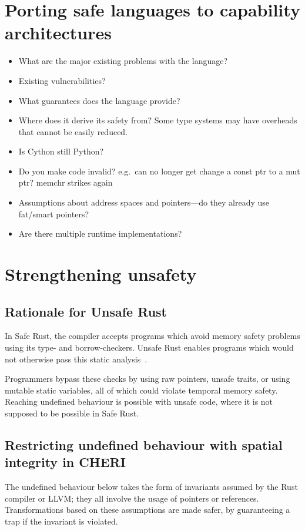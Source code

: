 \documentclass[dissertation.tex]{subfiles}
\begin{document}
\section{Porting safe languages to capability architectures}
\label{sec:eval-othersafe}

\begin{itemize}
    \item What are the major existing problems with the language?
    \item Existing vulnerabilities?
    \item What guarantees does the language provide?
    \item Where does it derive its safety from? Some type systems may
    have overheads that cannot be easily reduced.
    \item Is Cython still Python?
    \item Do you make code invalid? e.g.\ can no longer get change a
    const ptr to a mut ptr? memchr strikes again
    \item Assumptions about address spaces and pointers---do they
    already use fat/smart pointers?
    \item Are there multiple runtime implementations?
\end{itemize}


\section{Strengthening unsafety}
\label{sec:eval-betterunsafe}

\subsection{Rationale for Unsafe Rust}
In Safe Rust, the compiler accepts programs which avoid memory safety
problems using its type- and borrow-checkers.
Unsafe Rust enables programs which would not otherwise pass this static
analysis~\cite{rust-trpl-book}.

Programmers bypass these checks by using raw pointers, unsafe traits, or
using mutable static variables, all of which could violate temporal
memory safety.
Reaching undefined behaviour is possible with unsafe code, where it is
not supposed to be possible in Safe Rust.



\subsection{Restricting undefined behaviour with spatial integrity in CHERI}
The undefined behaviour below takes the form of invariants assumed by
the Rust compiler or LLVM; they all involve the usage of pointers or
references.
Transformations based on these assumptions are made safer, by
guaranteeing a trap if the invariant is violated.
\end{document}
